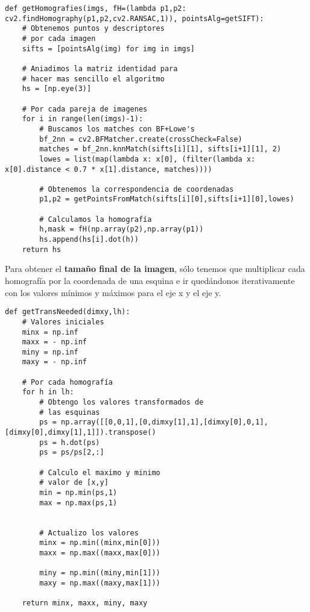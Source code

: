 \documentclass{article}
\begin{document}
\begin{lstlisting}
def getHomografies(imgs, fH=(lambda p1,p2: cv2.findHomography(p1,p2,cv2.RANSAC,1)), pointsAlg=getSIFT):
    # Obtenemos puntos y descriptores
    # por cada imagen
    sifts = [pointsAlg(img) for img in imgs]
    
    # Aniadimos la matriz identidad para 
    # hacer mas sencillo el algoritmo
    hs = [np.eye(3)]
	
    # Por cada pareja de imagenes
    for i in range(len(imgs)-1):
        # Buscamos los matches con BF+Lowe's
        bf_2nn = cv2.BFMatcher.create(crossCheck=False)
        matches = bf_2nn.knnMatch(sifts[i][1], sifts[i+1][1], 2)
        lowes = list(map(lambda x: x[0], (filter(lambda x: x[0].distance < 0.7 * x[1].distance, matches))))
        
        # Obtenemos la correspondencia de coordenadas
        p1,p2 = getPointsFromMatch(sifts[i][0],sifts[i+1][0],lowes)
		
        # Calculamos la homografía        
        h,mask = fH(np.array(p2),np.array(p1))
        hs.append(hs[i].dot(h))
    return hs
\end{lstlisting}

Para obtener el \textbf{tamaño final de la imagen}, sólo tenemos que multiplicar cada homografía por la coordenada de una esquina e ir quedándonos iterativamente con los valores mínimos y máximos para el eje x y el eje y.

\begin{lstlisting}
def getTransNeeded(dimxy,lh):
	# Valores iniciales
    minx = np.inf
    maxx = - np.inf
    miny = np.inf
    maxy = - np.inf
    
    # Por cada homografía
    for h in lh:
        # Obtengo los valores transformados de
        # las esquinas
        ps = np.array([[0,0,1],[0,dimxy[1],1],[dimxy[0],0,1],[dimxy[0],dimxy[1],1]]).transpose()
        ps = h.dot(ps)
        ps = ps/ps[2,:]
        
        # Calculo el maximo y minimo
        # valor de [x,y]
        min = np.min(ps,1)
        max = np.max(ps,1)
		
		
        # Actualizo los valores
        minx = np.min((minx,min[0]))
        maxx = np.max((maxx,max[0]))

        miny = np.min((miny,min[1]))
        maxy = np.max((maxy,max[1]))

    return minx, maxx, miny, maxy
\end{lstlisting}
\end{document}
